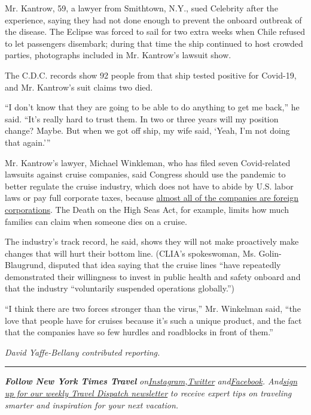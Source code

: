 Mr. Kantrow, 59, a lawyer from Smithtown, N.Y., sued Celebrity after the
experience, saying they had not done enough to prevent the onboard
outbreak of the disease. The Eclipse was forced to sail for two extra
weeks when Chile refused to let passengers disembark; during that time
the ship continued to host crowded parties, photographs included in Mr.
Kantrow's lawsuit show.

The C.D.C. records show 92 people from that ship tested positive for
Covid-19, and Mr. Kantrow's suit claims two died.

``I don't know that they are going to be able to do anything to get me
back,'' he said. ``It's really hard to trust them. In two or three years
will my position change? Maybe. But when we got off ship, my wife said,
`Yeah, I'm not doing that again.'''

Mr. Kantrow's lawyer, Michael Winkleman, who has filed seven
Covid-related lawsuits against cruise companies, said Congress should
use the pandemic to better regulate the cruise industry, which does not
have to abide by U.S. labor laws or pay full corporate taxes, because
\href{https://www.nytimes3xbfgragh.onion/2020/04/08/travel/cruises-coronavirus-stimulus.html}{almost
all of the companies are foreign corporations}. The Death on the High
Seas Act, for example, limits how much families can claim when someone
dies on a cruise.

The industry's track record, he said, shows they will not make
proactively make changes that will hurt their bottom line. (CLIA's
spokeswoman, Ms. Golin-Blaugrund, disputed that idea saying that the
cruise lines ``have repeatedly demonstrated their willingness to invest
in public health and safety onboard and that the industry ``voluntarily
suspended operations globally.'')

``I think there are two forces stronger than the virus,'' Mr. Winkelman
said, ``the love that people have for cruises because it's such a unique
product, and the fact that the companies have so few hurdles and
roadblocks in front of them.''

\emph{David Yaffe-Bellany contributed reporting.}

\begin{center}\rule{0.5\linewidth}{\linethickness}\end{center}

\emph{\textbf{Follow New York Times Travel}}
\emph{on}\href{https://www.instagram.com/nytimestravel/}{\emph{Instagram}}\emph{,}\href{https://twitter.com/nytimestravel}{\emph{Twitter}}
\emph{and}\href{https://www.facebookcorewwwi.onion/nytimestravel/}{\emph{Facebook}}\emph{.
And}\href{https://www.nytimes3xbfgragh.onion/newsletters/traveldispatch}{\emph{sign
up for our weekly Travel Dispatch newsletter}} \emph{to receive expert
tips on traveling smarter and inspiration for your next vacation.}

